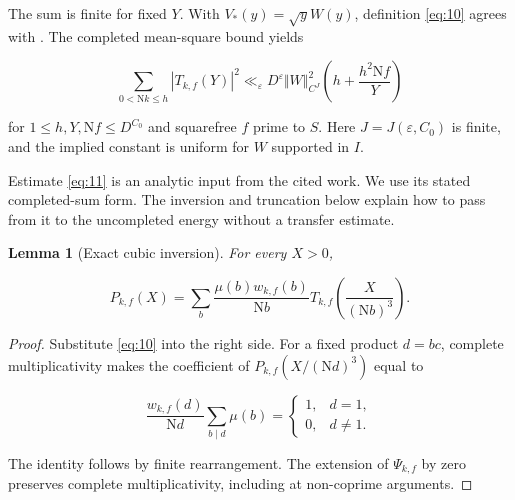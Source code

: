 \documentclass[reqno,a4paper,11pt]{amsart}
\newtheorem{lemma}{Lemma}[section]
\begin{document}
The sum is finite for fixed $Y$. With ${V}_{*}(y)=\sqrt{y}W(y)$, definition \eqref{eq:10} agrees with \cite[equations (5.3)--(5.4)]{theta}. The completed mean-square bound \cite[Proposition 5.2]{theta} yields

\begin{equation}\label{eq:11}
\sum _{0<\mathrm{N}k\le h} {\left| {T}_{k,f}\left( Y\right) \right| }^{2}{\ll }_{\varepsilon }{D}^{\varepsilon }\Vert W{\Vert }_{{C}^{J}}^{2}\left( h+\frac{{h}^{2}\mathrm{N}f}{Y}\right) 
\end{equation}

for $1\le h,Y,\mathrm{N}f\le {D}^{{C}_{0}}$ and squarefree $f$ prime to $S$. Here $J=J(\varepsilon ,{C}_{0})$ is finite, and the implied constant is uniform for $W$ supported in $I$.

Estimate \eqref{eq:11} is an analytic input from the cited work. We use its stated completed-sum form. The inversion and truncation below explain how to pass from it to the uncompleted energy without a transfer estimate.

\begin{lemma}[Exact cubic inversion]

For every $X>0$,

\begin{equation}\label{eq:12}
{P}_{k,f}\left( X\right) =\sum _{b} \frac{\mu \left( b\right) {w}_{k,f}\left( b\right) }{\mathrm{N}b}{T}_{k,f}\left( \frac{X}{{\left( \mathrm{N}b\right) }^{3}}\right) .
\end{equation}

\end{lemma}

\begin{proof}

Substitute \eqref{eq:10} into the right side. For a fixed product $d=bc$, complete multiplicativity makes the coefficient of ${P}_{k,f}\left( X/{\left( \mathrm{N}d\right) }^{3}\right) $ equal to

\[
\frac{{w}_{k,f}\left( d\right) }{\mathrm{N}d}\sum _{b\mid d} \mu \left( b\right) =\left\{ \begin{aligned} 1, & d=1, \\ 0, & d\ne 1. \end{aligned}\right. 
\]

The identity follows by finite rearrangement. The extension of ${\Psi }_{k,f}$ by zero preserves complete multiplicativity, including at non-coprime arguments.

\end{proof}
\end{document}
